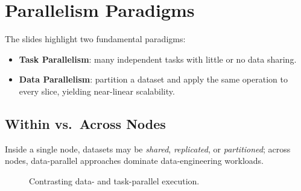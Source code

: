 \documentclass[11pt]{article}
\begin{document}
\section{Parallelism Paradigms}

The slides highlight two fundamental paradigms:

\begin{itemize}[itemsep=0pt]
  \item \textbf{Task Parallelism}: many independent tasks with little or no data sharing.
  \item \textbf{Data Parallelism}: partition a dataset and apply the same operation to every slice, yielding near-linear scalability.
\end{itemize}

\subsection{Within vs.\ Across Nodes}
Inside a single node, datasets may be \emph{shared}, \emph{replicated}, or \emph{partitioned}; across nodes, data-parallel approaches dominate data-engineering workloads.

\begin{figure}[h]
  \centering
  \caption{Contrasting data- and task-parallel execution.}
  \label{fig:paradigms}
\end{figure}

\end{document}
